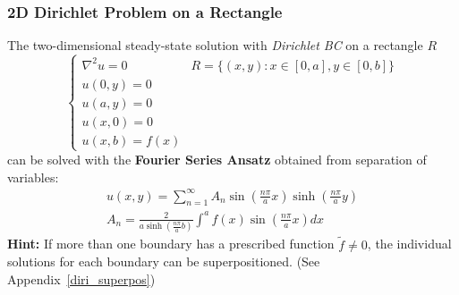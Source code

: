\subsubsection{2D Dirichlet Problem on a Rectangle}\label{sssec:laplace_dir_rect}
The two-dimensional steady-state solution with \textit{Dirichlet BC} on a rectangle $R$
\begin{equation*}
    \begin{cases}
        \nabla^2 u=0 & R = \{(x,y) : x\in [0,a], y\in [0,b]\} \\
        u(0,y)=0                                              \\
        u(a,y)=0                                              \\
        u(x,0)=0                                              \\
        u(x,b)=f(x)
    \end{cases}
\end{equation*}
can be solved with the \textbf{Fourier Series Ansatz} obtained from separation of variables:
\begin{align*}
    u(x,y)=\sum_{n=1}^{\infty}A_{n}\sin(\frac{n\pi}ax)\sinh(\frac{n\pi}ay) \\
    A_{n}=\frac{2}{a\sinh(\frac{n\pi}{a}b)}\int^{a}f(x)\sin(\frac{n\pi}{a}x)dx
\end{align*}
\textbf{Hint:} If more than one boundary has a prescribed function $\widetilde{f}\neq0$, the
individual solutions for each boundary can be superpositioned. (See Appendix~\ref{diri_superpos})

